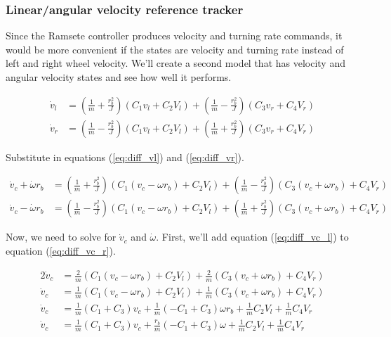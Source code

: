 \subsubsection{Linear/angular velocity reference tracker}

Since the Ramsete controller produces velocity and turning rate commands, it
would be more convenient if the \glspl{state} are velocity and turning rate
instead of left and right wheel velocity. We'll create a second model that has
velocity and angular velocity states and see how well it performs.

\begin{align*}
  \dot{v}_l &= \left(\frac{1}{m} + \frac{r_b^2}{J}\right)
    \left(C_1 v_l + C_2 V_l\right) +
    \left(\frac{1}{m} - \frac{r_b^2}{J}\right) \left(C_3 v_r + C_4 V_r\right) \\
  \dot{v}_r &= \left(\frac{1}{m} - \frac{r_b^2}{J}\right)
    \left(C_1 v_l + C_2 V_l\right) +
    \left(\frac{1}{m} + \frac{r_b^2}{J}\right) \left(C_3 v_r + C_4 V_r\right)
\end{align*}

Substitute in equations (\ref{eq:diff_vl}) and (\ref{eq:diff_vr}).

\begin{align}
  \dot{v}_c + \dot{\omega} r_b &= \left(\frac{1}{m} + \frac{r_b^2}{J}\right)
    \left(C_1(v_c - \omega r_b) + C_2 V_l\right) +
    \left(\frac{1}{m} - \frac{r_b^2}{J}\right) \left(C_3(v_c + \omega r_b) +
      C_4 V_r\right) \label{eq:diff_vc_l} \\
  \dot{v}_c - \dot{\omega} r_b &= \left(\frac{1}{m} - \frac{r_b^2}{J}\right)
    \left(C_1(v_c - \omega r_b) + C_2 V_l\right) +
    \left(\frac{1}{m} + \frac{r_b^2}{J}\right) \left(C_3(v_c + \omega r_b) +
      C_4 V_r\right) \label{eq:diff_vc_r}
\end{align}

Now, we need to solve for $\dot{v}_c$ and $\dot{\omega}$. First, we'll add
equation (\ref{eq:diff_vc_l}) to equation (\ref{eq:diff_vc_r}).

\begin{align*}
  2\dot{v}_c &= \frac{2}{m} \left(C_1(v_c - \omega r_b) + C_2 V_l\right) +
    \frac{2}{m} \left(C_3(v_c + \omega r_b) + C_4 V_r\right) \\
  \dot{v}_c &= \frac{1}{m} \left(C_1(v_c - \omega r_b) + C_2 V_l\right) +
    \frac{1}{m} \left(C_3(v_c + \omega r_b) + C_4 V_r\right) \\
  \dot{v}_c &= \frac{1}{m} (C_1 + C_3) v_c +
    \frac{1}{m} (-C_1 + C_3) \omega r_b + \frac{1}{m} C_2 V_l +
    \frac{1}{m} C_4 V_r \\
  \dot{v}_c &= \frac{1}{m} (C_1 + C_3) v_c + \frac{r_b}{m} (-C_1 + C_3) \omega +
    \frac{1}{m} C_2 V_l + \frac{1}{m} C_4 V_r
\end{align*}

